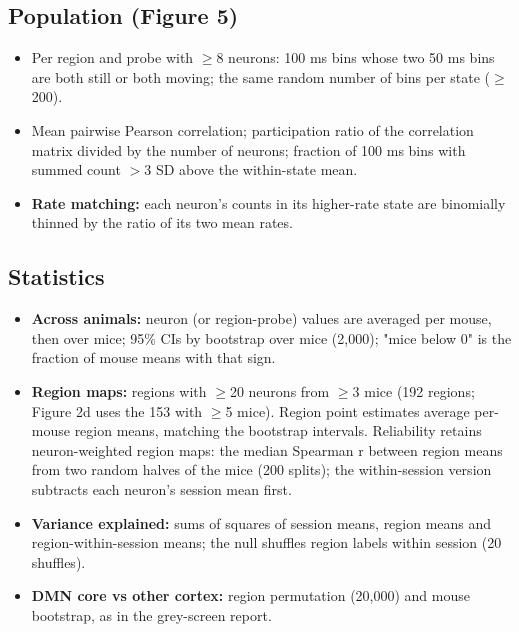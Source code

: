 \documentclass[10pt,a4paper]{article}
\begin{document}
\subsection{Population (Figure 5)}
\begin{itemize}
\item Per region and probe with $\geq$8 neurons: 100 ms bins whose two 50 ms bins are both still or both moving; the same random number of bins per state ($\geq$200).
\item Mean pairwise Pearson correlation; participation ratio of the correlation matrix divided by the number of neurons; fraction of 100 ms bins with summed count $>$3 SD above the within-state mean.
\item \textbf{Rate matching:} each neuron's counts in its higher-rate state are binomially thinned by the ratio of its two mean rates.
\end{itemize}
\subsection{Statistics}
\begin{itemize}
\item \textbf{Across animals:} neuron (or region-probe) values are averaged per mouse, then over mice; 95\% CIs by bootstrap over mice (2,000); "mice below 0" is the fraction of mouse means with that sign.
\item \textbf{Region maps:} regions with $\geq$20 neurons from $\geq$3 mice (192 regions; Figure 2d uses the 153 with $\geq$5 mice). Region point estimates average per-mouse region means, matching the bootstrap intervals. Reliability retains neuron-weighted region maps: the median Spearman r between region means from two random halves of the mice (200 splits); the within-session version subtracts each neuron's session mean first.
\item \textbf{Variance explained:} sums of squares of session means, region means and region-within-session means; the null shuffles region labels within session (20 shuffles).
\item \textbf{DMN core vs other cortex:} region permutation (20,000) and mouse bootstrap, as in the grey-screen report.
\end{itemize}
\end{document}

